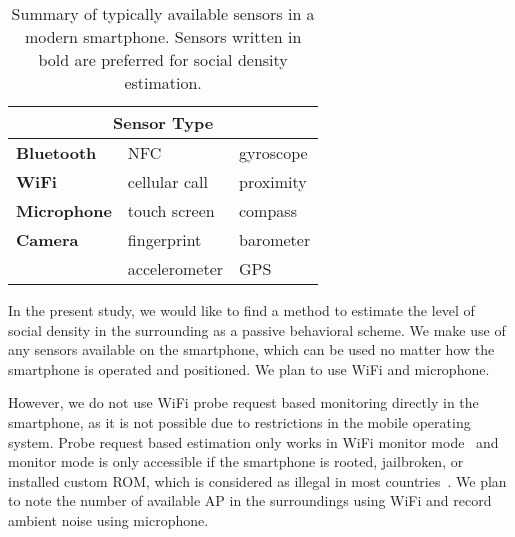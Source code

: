 


\begin{table}[h]
\centering
\caption{Summary of typically available sensors in a modern smartphone. Sensors written in bold are preferred for social density estimation.}
\label{tab:smartphone-sensor-summary}
\begin{tabular}{lll}
\toprule
\multicolumn{3}{c}{Sensor Type} \\ \midrule
\textbf{Bluetooth}   & \ac{NFC}                    & gyroscope \\
\textbf{WiFi}        & cellular call               & proximity \\
\textbf{Microphone}  & touch screen                & compass \\
\textbf{Camera}      & fingerprint                 & barometer \\
                     & accelerometer               & \ac{GPS} \\
\bottomrule
\end{tabular}
\end{table}

In the present study, we would like to find a method to estimate the level of social density in the surrounding as a passive behavioral scheme. We make use of any sensors available on the smartphone, which can be used no matter how the smartphone is operated and positioned. We plan to use WiFi and microphone.

However, we do not use WiFi probe request based monitoring directly in the smartphone, as it is not possible due to restrictions in the mobile operating system. Probe request based estimation only works in WiFi monitor mode~\cite{thesis052,thesis079} and monitor mode is only accessible if the smartphone is rooted, jailbroken, or installed custom \ac{ROM}, which is considered as illegal in most countries~\cite{rootjailbreak}. We plan to note the number of available \ac{AP} in the surroundings using WiFi and record ambient noise using microphone.

